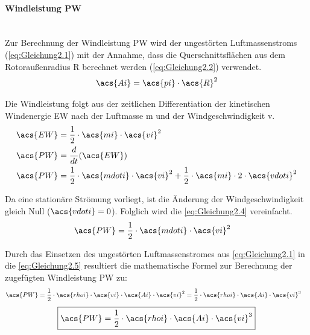 \paragraph{Windleistung \acs{PW}}\mbox{}\smallskip\\
Zur Berechnung der Windleistung \acs{PW} wird der ungestörten Luftmassenstroms (\autoref{eq:Gleichung2.1}) mit der Annahme, dass die Querschnittsflächen aus dem Rotoraußenradius \acs{R} berechnet werden (\autoref{eq:Gleichung2.2}) verwendet.
\begin{align}
    \acs{Ai} = \acs{pi}\cdot \acs{R}^2
    \label{eq:Gleichung2.2}
\end{align}

Die Windleistung folgt aus der zeitlichen Differentiation der kinetischen Windenergie \acs{EW} nach der Luftmasse \acs{m} und der Windgeschwindigkeit \acs{v}. 
\begin{align}
    \acs{EW} &= \frac{1}{2} \cdot \acs{mi} \cdot \acs{vi}^2 \nonumber \\
    \acs{PW} &= \frac{d}{dt}(\acs{EW}) \label{eq:Gleichung2.3} \\
    \acs{PW} &= \frac{1}{2} \cdot \acs{mdoti} \cdot \acs{vi}^2 + \frac{1}{2} \cdot \acs{mi} \cdot 2 \cdot \acs{vdoti}^2 \label{eq:Gleichung2.4}
\end{align}

Da eine stationäre Strömung vorliegt, ist die Änderung der Windgeschwindigkeit gleich Null ($\acs{vdoti} = 0$). Folglich wird die \autoref{eq:Gleichung2.4} vereinfacht.
\begin{align}
    \acs{PW} &= \frac{1}{2} \cdot \acs{mdoti} \cdot \acs{vi}^2 \label{eq:Gleichung2.5}
\end{align}

Durch das Einsetzen des ungestörten Luftmassenstromes aus \autoref{eq:Gleichung2.1} in die \autoref{eq:Gleichung2.5} resultiert die mathematische Formel zur Berechnung der zugefügten Windleistung \acs{PW} zu:
\begin{align*}
    \acs{PW} &= \frac{1}{2} \cdot \acs{rhoi} \cdot \acs{vi} \cdot \acs{Ai} \cdot \acs{vi}^2 = \frac{1}{2} \cdot \acs{rhoi} \cdot \acs{Ai} \cdot \acs{vi}^3
\end{align*}
\begin{equation}\label{eq:Gleichung2.6}
    \boxed{\acs{PW} = \frac{1}{2} \cdot \acs{rhoi} \cdot \acs{Ai} \cdot \acs{vi}^3} 
\end{equation}

